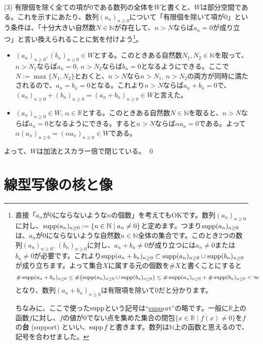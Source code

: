 \noindent (3) 有限個を除く全ての項が$0$である数列の全体を$W$と書くと、$W$は部分空間である。これを示すにあたり、数列$(a_n)_{n\geq 0}$について「有限個を除いて項が$0$」という条件は、「十分大きい自然数$N\in\mathbb{N}$が存在して、$n>N$ならば$a_n = 0$が成り立つ」と言い換えられることに気を付けよう\footnote{直接「$a_n$が$0$にならないような$n$の個数」を考えてもOKです。数列$(a_n)_{n \geq 0}$に対し、$\operatorname{supp} (a_n)_{n\geq 0}:=\{n\in\mathbb{N}\mid a_n \neq 0\}$と定めます。つまり$\operatorname{supp} (a_n)_{n\geq 0}$は、$a_n$が$0$にならないような自然数$n\in\mathbb{N}$全体の集合です。このとき$2$つの数列$(a_n)_{n \geq 0}$, $(b_n)_{n \geq 0}$に対し、$a_n + b_n \neq 0$が成り立つには$a_n \neq 0$または$b_n \neq 0$が必要です。これより$\operatorname{supp} (a_n + b_n)_{n\geq 0} \subset \operatorname{supp} (a_n)_{n\geq 0} \cup \operatorname{supp} (b_n)_{n\geq 0}$が成り立ちます。よって集合$X$に属する元の個数を$\#X$と書くことにすると
\[
\#\operatorname{supp} (a_n + b_n)_{n\geq 0} \leq \#\bigl(\operatorname{supp} (a_n)_{n\geq 0} \cup \operatorname{supp} (b_n)_{n\geq 0}\bigr)
\leq \#\operatorname{supp} (a_n)_{n\geq 0} + \#\operatorname{supp} (b_n)_{n\geq 0} < \infty
\]
となり、数列$(a_n + b_n)_{n \geq 0}$は有限項を除いて$0$だと分かります。

ちなみに、ここで使った$\operatorname{supp}$という記号は``\underline{supp}ort''の略です。一般に$\mathbb{R}$上の函数$f$に対し、$f$の値が$0$でない点を集めた集合の閉包$\overline{\{x\in\mathbb{R}\mid f(x)\neq 0\}}$を$f$の\textbf{台} (support) といい、$\operatorname{supp} f$と書きます。数列は$\mathbb{N}$上の函数と思えるので、記号を合わせました。
}。
\begin{itemize}
\item $(a_n)_{n \geq 0}, (b_n)_{n \geq 0}\in W$とする。このときある自然数$N_1, N_2\in\mathbb{N}$を取って、$n > N_1$ならば$a_n =0$, $n > N_2$ならば$b_n = 0$となるようにできる。ここで$N := \max\{N_1, N_2\}$とおくと、$n > N$なら$n > N_1$, $n > N_2$の両方が同時に満たされるので、$a_n = b_n = 0$となる。これより$n > N$ならば$a_n + b_n = 0$で、$(a_n)_{n \geq 0} + (b_n)_{n \geq 0} = (a_n + b_n)_{n \geq 0}\in W$と言えた。
\item $(a_n)_{n \geq 0}\in W$, $\alpha \in \mathbb{R}$とする。このときある自然数$N\in\mathbb{N}$を取ると、$n > N$ならば$a_n = 0$となるようにできる。すると$n > N$ならば$\alpha a_n = 0$である。よって$\alpha (a_n)_{n \geq 0} = (\alpha a_n)_{n \geq 0}\in W$である。
\end{itemize}
よって、$W$は加法とスカラー倍で閉じている。 \qed

\section{線型写像の核と像}

